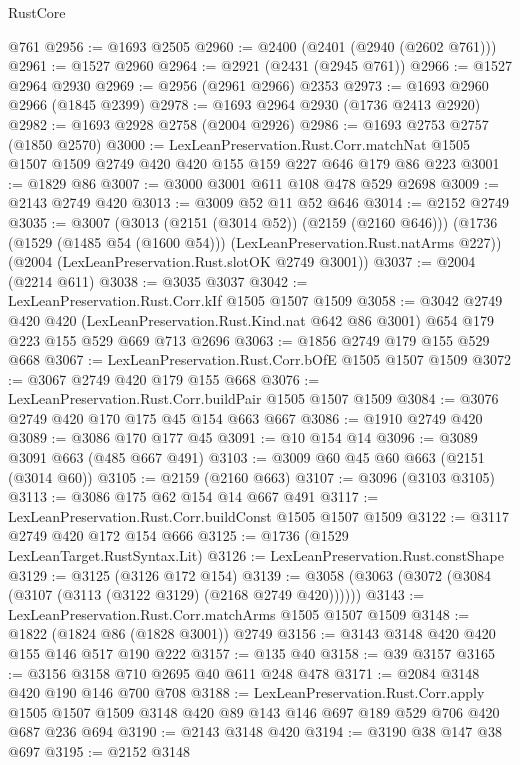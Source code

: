 \begin{lexlean}{RustCore}
\begin{coremodule}
    @761
@2956 := @1693 @2505
@2960 := @2400 (@2401 (@2940 (@2602 @761)))
@2961 := @1527 @2960
@2964 := @2921 (@2431 (@2945 @761))
@2966 := @1527 @2964 @2930
@2969 := @2956 (@2961 @2966) @2353
@2973 := @1693 @2960 @2966 (@1845 @2399)
@2978 := @1693 @2964 @2930 (@1736 @2413 @2920)
@2982 := @1693 @2928 @2758 (@2004 @2926)
@2986 := @1693 @2753 @2757 (@1850 @2570)
@3000 := LexLeanPreservation.Rust.Corr.matchNat
    @1505
    @1507
    @1509
    @2749
    @420
    @420
    @155
    @159
    @227
    @646
    @179
    @86
    @223
@3001 := @1829 @86
@3007 := @3000 @3001 @611 @108 @478 @529 @2698
@3009 := @2143 @2749 @420
@3013 := @3009 @52 @11 @52 @646
@3014 := @2152 @2749
@3035 := @3007
    (@3013 (@2151 (@3014 @52)) (@2159 (@2160 @646)))
    (@1736 (@1529 (@1485 @54 (@1600 @54))) (LexLeanPreservation.Rust.natArms @227))
    (@2004 (LexLeanPreservation.Rust.slotOK @2749 @3001))
@3037 := @2004 (@2214 @611)
@3038 := @3035 @3037
@3042 := LexLeanPreservation.Rust.Corr.kIf @1505 @1507 @1509
@3058 := @3042
    @2749
    @420
    @420
    (LexLeanPreservation.Rust.Kind.nat @642 @86 @3001)
    @654
    @179
    @223
    @155
    @529
    @669
    @713
    @2696
@3063 := @1856 @2749 @179 @155 @529 @668
@3067 := LexLeanPreservation.Rust.Corr.bOfE @1505 @1507 @1509
@3072 := @3067 @2749 @420 @179 @155 @668
@3076 := LexLeanPreservation.Rust.Corr.buildPair @1505 @1507 @1509
@3084 := @3076 @2749 @420 @170 @175 @45 @154 @663 @667
@3086 := @1910 @2749 @420
@3089 := @3086 @170 @177 @45
@3091 := @10 @154 @14
@3096 := @3089 @3091 @663 (@485 @667 @491)
@3103 := @3009 @60 @45 @60 @663 (@2151 (@3014 @60))
@3105 := @2159 (@2160 @663)
@3107 := @3096 (@3103 @3105)
@3113 := @3086 @175 @62 @154 @14 @667 @491
@3117 := LexLeanPreservation.Rust.Corr.buildConst @1505 @1507 @1509
@3122 := @3117 @2749 @420 @172 @154 @666
@3125 := @1736 (@1529 LexLeanTarget.RustSyntax.Lit)
@3126 := LexLeanPreservation.Rust.constShape
@3129 := @3125 (@3126 @172 @154)
@3139 := @3058 (@3063 (@3072 (@3084 (@3107 (@3113 (@3122 @3129) (@2168 @2749 @420))))))
@3143 := LexLeanPreservation.Rust.Corr.matchArms @1505 @1507 @1509
@3148 := @1822 (@1824 @86 (@1828 @3001)) @2749
@3156 := @3143 @3148 @420 @420 @155 @146 @517 @190 @222
@3157 := @135 @40
@3158 := @39 @3157
@3165 := @3156 @3158 @710 @2695 @40 @611 @248 @478
@3171 := @2084 @3148 @420 @190 @146 @700 @708
@3188 := LexLeanPreservation.Rust.Corr.apply
    @1505
    @1507
    @1509
    @3148
    @420
    @89
    @143
    @146
    @697
    @189
    @529
    @706
    @420
    @687
    @236
    @694
@3190 := @2143 @3148 @420
@3194 := @3190 @38 @147 @38 @697
@3195 := @2152 @3148

\end{coremodule}
\end{lexlean}
